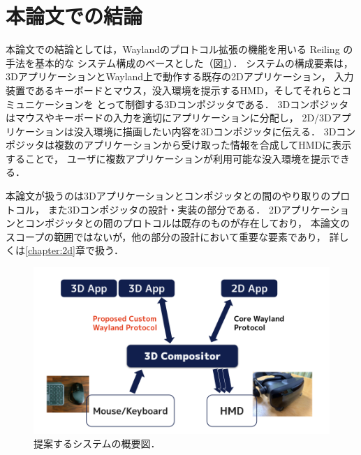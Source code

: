 \section{本論文での結論}
\label{section:overview:conclusion}

本論文での結論としては，Waylandのプロトコル拡張の機能を用いる Reiling の手法を基本的な
システム構成のベースとした（図\ref{fig:overview}）．
システムの構成要素は，3DアプリケーションとWayland上で動作する既存の2Dアプリケーション，
入力装置であるキーボードとマウス，没入環境を提示するHMD，そしてそれらとコミュニケーションを
とって制御する3Dコンポジッタである．
3Dコンポジッタはマウスやキーボードの入力を適切にアプリケーションに分配し，
2D/3Dアプリケーションは没入環境に描画したい内容を3Dコンポジッタに伝える．
3Dコンポジッタは複数のアプリケーションから受け取った情報を合成してHMDに表示することで，
ユーザに複数アプリケーションが利用可能な没入環境を提示できる．


本論文が扱うのは3Dアプリケーションとコンポジッタとの間のやり取りのプロトコル，
また3Dコンポジッタの設計・実装の部分である．
2Dアプリケーションとコンポジッタとの間のプロトコルは既存のものが存在しており，
本論文のスコープの範囲ではないが，他の部分の設計において重要な要素であり，
詳しくは\ref{chapter:2d}章で扱う．

\begin{figure}[htbp]
  \centering
  \includegraphics[keepaspectratio, width=\linewidth]{figures/overview.png}
  \caption{提案するシステムの概要図．}
  \label{fig:overview}
\end{figure}

